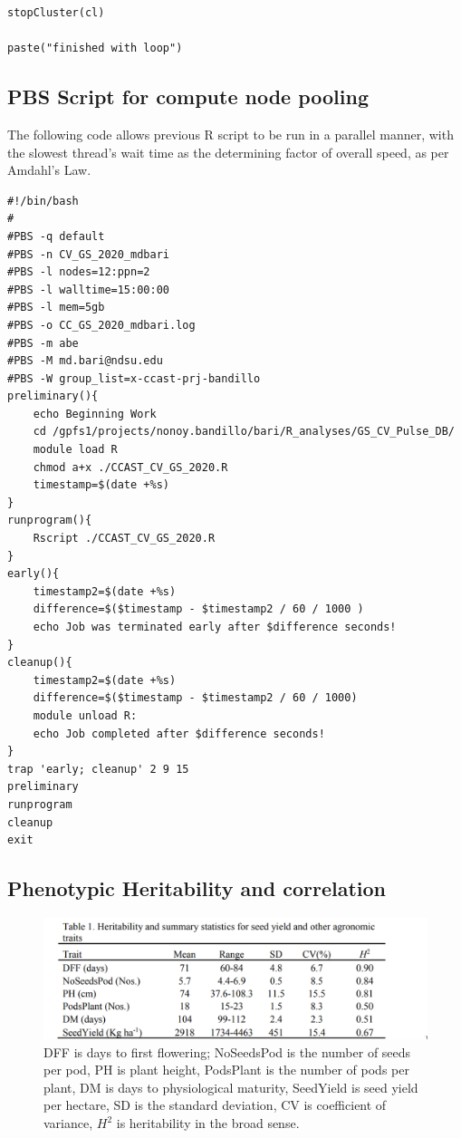 \documentclass[12pt, letterpaper,oneocolumn]{article}
\begin{document}
\begin{appendices}
\begin{lstlisting}
stopCluster(cl)

paste("finished with loop")
	\end{lstlisting}

\subsection{PBS Script for compute node pooling}
The following code allows previous R script to be run in a parallel manner, with the slowest thread's wait time as the determining factor of overall speed, as per Amdahl's Law.
	\lstset{language=BASH}
	\begin{lstlisting}
#!/bin/bash
#
#PBS -q default
#PBS -n CV_GS_2020_mdbari
#PBS -l nodes=12:ppn=2
#PBS -l walltime=15:00:00
#PBS -l mem=5gb
#PBS -o CC_GS_2020_mdbari.log
#PBS -m abe
#PBS -M md.bari@ndsu.edu
#PBS -W group_list=x-ccast-prj-bandillo
preliminary(){
    echo Beginning Work
    cd /gpfs1/projects/nonoy.bandillo/bari/R_analyses/GS_CV_Pulse_DB/
    module load R
    chmod a+x ./CCAST_CV_GS_2020.R
    timestamp=$(date +%s)
}
runprogram(){
    Rscript ./CCAST_CV_GS_2020.R
}
early(){
    timestamp2=$(date +%s)
    difference=$($timestamp - $timestamp2 / 60 / 1000 )
    echo Job was terminated early after $difference seconds!
}
cleanup(){
    timestamp2=$(date +%s)
    difference=$($timestamp - $timestamp2 / 60 / 1000)
    module unload R:
    echo Job completed after $difference seconds!
}
trap 'early; cleanup' 2 9 15
preliminary
runprogram
cleanup
exit

\end{lstlisting}

\subsection{Phenotypic Heritability and correlation}
\begin{center}
	\begin{figure}[H]
	\includegraphics[width=\linewidth]{table1.png}
		{DFF is days to first flowering; NoSeedsPod is the number of seeds per pod, PH is plant height, PodsPlant is the number of pods per plant, DM is days to physiological maturity, SeedYield is seed yield per hectare, SD is the standard deviation, CV is coefficient of variance, $H^2$ is heritability in the broad sense.}
		\end{figure}
\end{center}


\end{appendices}
\end{document}
